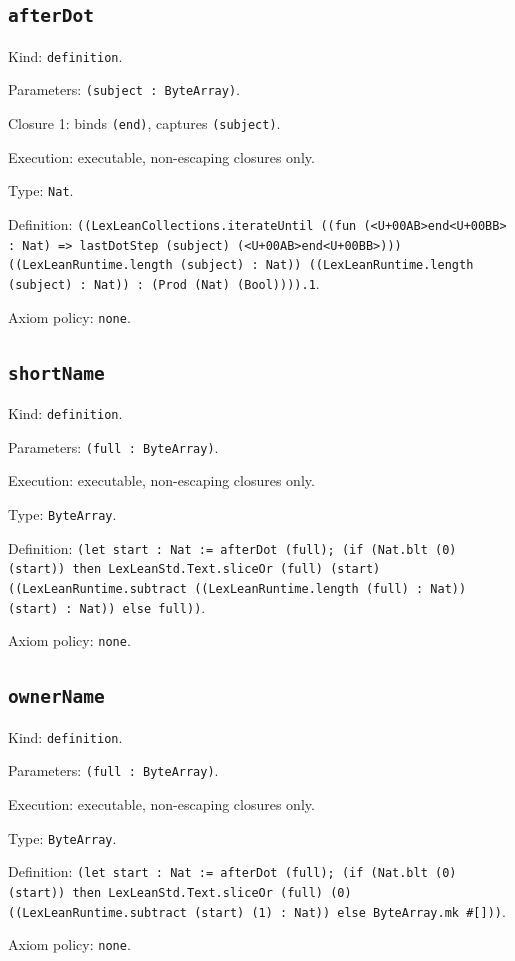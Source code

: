 \documentclass[11pt]{article}
\begin{document}
\subsection*{\texttt{afterDot}}
\noindent Kind: \texttt{definition}.\par
\noindent Parameters: \texttt{(subject : ByteArray)}.\par
\noindent Closure 1: binds \texttt{(end)}, captures \texttt{(subject)}.\par
\noindent Execution: executable, non-escaping closures only.\par
\noindent Type: \texttt{Nat}.\par
\noindent Definition: \texttt{((LexLeanCollections.iterateUntil ((fun (<U+00AB>end<U+00BB> : Nat) => lastDotStep (subject) (<U+00AB>end<U+00BB>))) ((LexLeanRuntime.length (subject) : Nat)) ((LexLeanRuntime.length (subject) : Nat)) : (Prod (Nat) (Bool)))).1}.\par
\noindent Axiom policy: \texttt{none}.\par
\subsection*{\texttt{shortName}}
\noindent Kind: \texttt{definition}.\par
\noindent Parameters: \texttt{(full : ByteArray)}.\par
\noindent Execution: executable, non-escaping closures only.\par
\noindent Type: \texttt{ByteArray}.\par
\noindent Definition: \texttt{(let start : Nat := afterDot (full); (if (Nat.blt (0) (start)) then LexLeanStd.Text.sliceOr (full) (start) ((LexLeanRuntime.subtract ((LexLeanRuntime.length (full) : Nat)) (start) : Nat)) else full))}.\par
\noindent Axiom policy: \texttt{none}.\par
\subsection*{\texttt{ownerName}}
\noindent Kind: \texttt{definition}.\par
\noindent Parameters: \texttt{(full : ByteArray)}.\par
\noindent Execution: executable, non-escaping closures only.\par
\noindent Type: \texttt{ByteArray}.\par
\noindent Definition: \texttt{(let start : Nat := afterDot (full); (if (Nat.blt (0) (start)) then LexLeanStd.Text.sliceOr (full) (0) ((LexLeanRuntime.subtract (start) (1) : Nat)) else ByteArray.mk \#[]))}.\par
\noindent Axiom policy: \texttt{none}.\par
\end{document}
